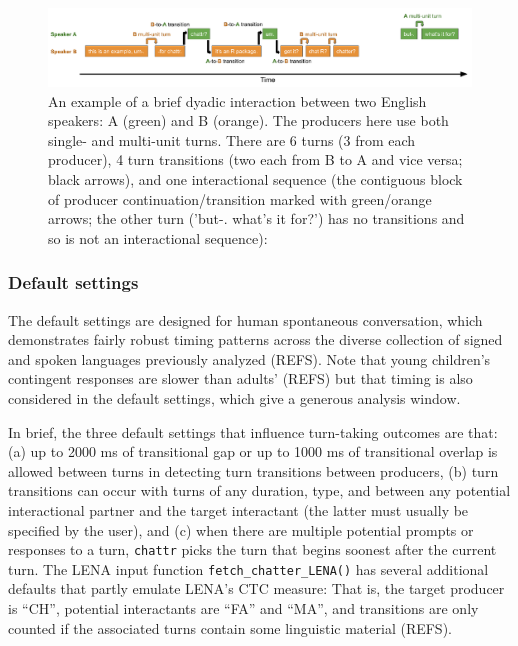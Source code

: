 \documentclass[10pt, letterpaper]{article}
\newenvironment{CodeChunk}{}{}
\begin{document}
\begin{CodeChunk}
\begin{figure}[h]

{\centering \includegraphics{figs/minisequence-1} 

}

\caption[An example of a brief dyadic interaction between two English speakers]{An example of a brief dyadic interaction between two English speakers: A (green) and B (orange). The producers here use both single- and multi-unit turns. There are 6 turns (3 from each producer), 4 turn transitions (two each from B to A and vice versa; black arrows), and one interactional sequence (the contiguous block of producer continuation/transition marked with green/orange arrows; the other turn ('but-. what's it for?') has no transitions and so is not an interactional sequence):}\label{fig:minisequence}
\end{figure}
\end{CodeChunk}

\hypertarget{default-settings}{%
\subsubsection{Default settings}\label{default-settings}}

The default settings are designed for human spontaneous conversation,
which demonstrates fairly robust timing patterns across the diverse
collection of signed and spoken languages previously analyzed (REFS).
Note that young children's contingent responses are slower than adults'
(REFS) but that timing is also considered in the default settings, which
give a generous analysis window.

In brief, the three default settings that influence turn-taking outcomes
are that: (a) up to 2000 ms of transitional gap or up to 1000 ms of
transitional overlap is allowed between turns in detecting turn
transitions between producers, (b) turn transitions can occur with turns
of any duration, type, and between any potential interactional partner
and the target interactant (the latter must usually be specified by the
user), and (c) when there are multiple potential prompts or responses to
a turn, \texttt{chattr} picks the turn that begins soonest after the
current turn. The LENA input function \texttt{fetch\_chatter\_LENA()}
has several additional defaults that partly emulate LENA's CTC measure:
That is, the target producer is ``CH'', potential interactants are
``FA'' and ``MA'', and transitions are only counted if the associated
turns contain some linguistic material (REFS).
\end{document}
